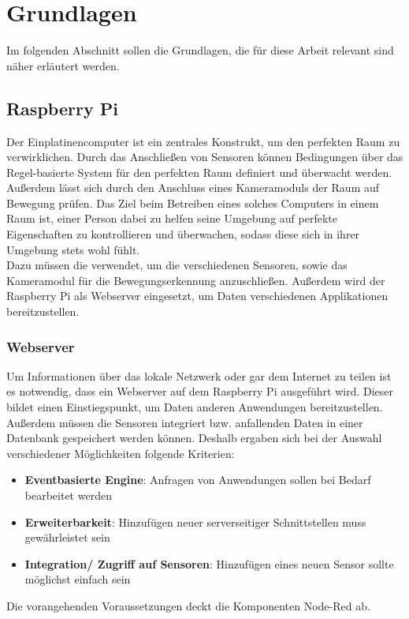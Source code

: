 \chapter{Grundlagen}
Im folgenden Abschnitt sollen die Grundlagen, die für diese Arbeit relevant sind näher erläutert werden.

\section{Raspberry Pi}%
Der Einplatinencomputer ist ein zentrales Konstrukt, um den perfekten Raum zu verwirklichen. Durch das Anschließen von Sensoren können Bedingungen über das Regel-basierte System für den perfekten Raum definiert und überwacht werden. Außerdem lässt sich durch den Anschluss eines Kameramoduls der Raum auf Bewegung prüfen. Das Ziel beim Betreiben eines solches Computers in einem Raum ist, einer Person dabei zu helfen seine Umgebung auf perfekte Eigenschaften zu kontrollieren und überwachen, sodass diese sich in ihrer Umgebung stets wohl fühlt. 
\\Dazu müssen die verwendet, um die verschiedenen Sensoren, sowie das Kameramodul für die Bewegungserkennung anzuschließen. Außerdem wird der Raspberry Pi als Webserver eingesetzt, um Daten verschiedenen Applikationen bereitzustellen. 

\subsection{Webserver}
Um Informationen über das lokale Netzwerk oder gar dem Internet zu teilen ist es notwendig, dass ein Webserver auf dem Raspberry Pi ausgeführt wird. Dieser bildet einen Einstiegspunkt, um Daten anderen Anwendungen bereitzustellen. Außerdem müssen die Sensoren integriert bzw. anfallenden Daten in einer Datenbank gespeichert werden können. Deshalb ergaben sich bei der Auswahl verschiedener Möglichkeiten folgende Kriterien:
\begin{itemize}
	\item \textbf{Eventbasierte Engine}: Anfragen von Anwendungen sollen bei Bedarf bearbeitet werden
	\item \textbf{Erweiterbarkeit}: Hinzufügen neuer serverseitiger Schnittstellen muss gewährleistet sein
	\item \textbf{Integration/ Zugriff auf Sensoren}: Hinzufügen eines neuen Sensor sollte möglichst einfach sein
\end{itemize} 
Die vorangehenden Voraussetzungen deckt die Komponenten Node-Red ab.
